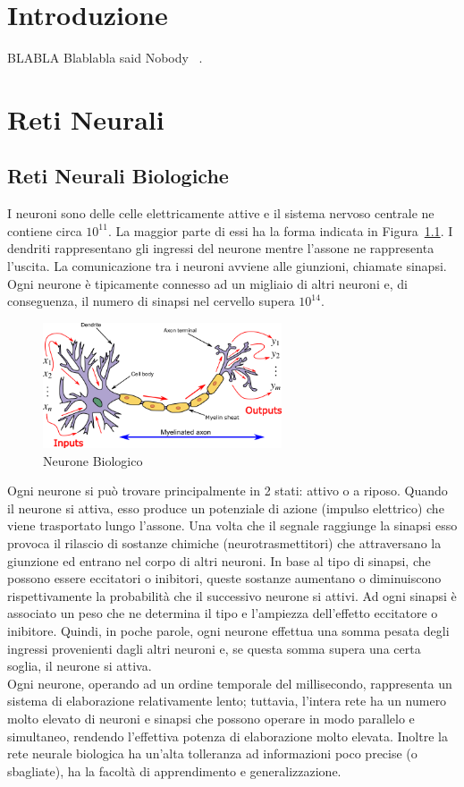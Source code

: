 \documentclass[11pt,a4paper,twoside,
openright]{book}
\begin{document}
\tableofcontents

\chapter*{Introduzione}
BLABLA
Blablabla said Nobody ~\cite{Nobody06}.
\chapter{Reti Neurali}
\section{Reti Neurali Biologiche}
I neuroni sono delle celle elettricamente attive e il sistema nervoso centrale ne contiene circa $10^{11}$. La maggior parte di essi ha la forma indicata in Figura~\ref{fig:neurbio}. I dendriti rappresentano gli ingressi del neurone mentre l’assone ne rappresenta l’uscita. La comunicazione tra i neuroni avviene alle giunzioni, chiamate sinapsi. Ogni neurone è tipicamente connesso ad un migliaio di altri neuroni e, di conseguenza, il numero di sinapsi nel cervello supera $10^{14}$.
\begin{figure}[h!]
\begin{center}
\includegraphics[width=200pt]{BioNeuron.png}
\caption{Neurone Biologico~\cite{pict_neur}}
\end{center}
\label{fig:neurbio}
\end{figure}

Ogni neurone si può trovare principalmente in 2 stati: attivo o a riposo. Quando il neurone si attiva, esso produce un potenziale di azione (impulso elettrico) che viene trasportato lungo l’assone. Una volta che il segnale raggiunge la sinapsi esso provoca il rilascio di sostanze chimiche (neurotrasmettitori) che attraversano la giunzione ed entrano nel corpo di altri neuroni. In base al tipo di sinapsi, che possono essere eccitatori o inibitori, queste sostanze aumentano o diminuiscono rispettivamente la probabilità che il successivo neurone si attivi. Ad ogni sinapsi è associato un peso che ne determina il tipo e l’ampiezza dell’effetto eccitatore o inibitore. Quindi, in poche parole, ogni neurone effettua una somma pesata degli ingressi provenienti dagli altri neuroni e, se questa somma supera una certa soglia, il neurone si attiva.\\
Ogni neurone, operando ad un ordine temporale del millisecondo, rappresenta un sistema di elaborazione relativamente lento; tuttavia, l’intera rete ha un numero molto elevato di neuroni e sinapsi che possono operare in modo parallelo e simultaneo, rendendo l’effettiva potenza di elaborazione molto elevata. Inoltre la rete neurale biologica ha un’alta tolleranza ad informazioni poco precise (o sbagliate), ha la facoltà di apprendimento e generalizzazione.
\end{document}
